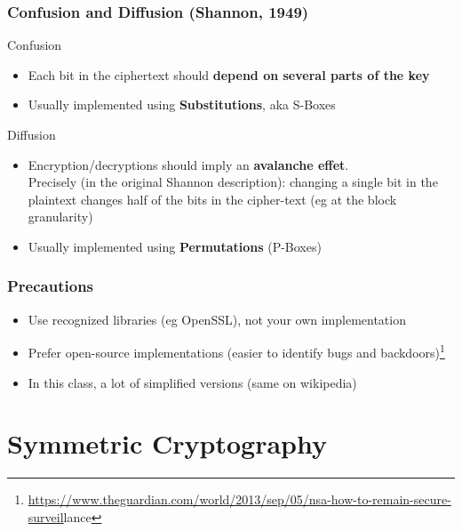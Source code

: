 \documentclass[
hyperref={pdfpagelabels=false}
,xcolor=table
]
{beamer}
\begin{document}
\begin{frame}
  \frametitle{Confusion and Diffusion (Shannon, 1949)}

  \begin{block}{Confusion}
    \begin{itemize}
    \item Each bit in the ciphertext should \textbf{depend on several parts of
      the key}
    \item Usually implemented using \textbf{Substitutions}, aka S-Boxes
    \end{itemize}
  \end{block}


  \begin{block}{Diffusion}
    \begin{itemize}
    \item Encryption/decryptions should imply an \textbf{avalanche effet}. \\ Precisely (in the original Shannon description): changing a single bit in the plaintext changes half of the bits in the cipher-text (eg at the block granularity)
    \item Usually implemented using \textbf{Permutations} (P-Boxes)
    \end{itemize}
  \end{block}
  
\end{frame}



\begin{frame}
  \frametitle{Precautions}

  \begin{itemize}
  \item Use recognized libraries (eg OpenSSL), not your own implementation
  \item Prefer open-source implementations (easier to identify bugs and backdoors)\footnote{\url{https://www.theguardian.com/world/2013/sep/05/nsa-how-to-remain-secure-surveil}lance}
  \item In this class, a lot of simplified versions (same on wikipedia)
  \end{itemize}

  
\end{frame}

\section{Symmetric Cryptography}
\end{document}
